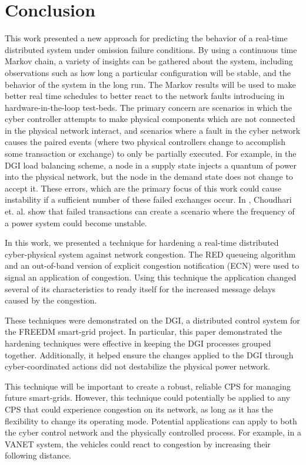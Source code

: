 
\chapter{Conclusion}

This work presented a new approach for predicting the behavior of a real-time distributed system under omission failure conditions.
By using a continuous time Markov chain, a variety of insights can be gathered about the system, including observations such as how long a particular configuration will be stable, and the behavior of the system in the long run. 
The Markov results will be used  to make better real time schedules to better react to the network faults introducing in hardware-in-the-loop test-beds.
The primary concern are scenarios in which the cyber controller attempts to make physical components which are not connected in the physical network interact, and scenarios where a fault in the cyber network causes the paired events (where two physical controllers change to accomplish some transaction or exchange) to only be partially executed.
For example, in the DGI load balancing scheme, a node in a supply state injects a quantum of power into the physical network, but the node in the demand state does not change to accept it.
These errors, which are the primary focus of this work could cause instability if a sufficient number of these failed exchanges occur. In \cite{HARINI}, Choudhari et. al. show that failed transactions can create a scenario where the frequency of a power system could become unstable. 

In this work, we presented a technique for hardening a real-time distributed cyber-physical system against network congestion.
The \ac{RED} queueing algorithm and an out-of-band version of explicit congestion notification (ECN) were used to signal an application of congestion.
Using this technique the application changed several of its characteristics to ready itself for the increased message delays caused by the congestion.

These techniques were demonstrated on the \ac{DGI}, a distributed control system for the \ac{FREEDM} smart-grid project.
In particular, this paper demonstrated the hardening techniques were effective in keeping the \ac{DGI} processes grouped together.
Additionally, it helped ensure the changes applied to the \ac{DGI} through cyber-coordinated actions did not destabilize the physical power network.

This technique will be important to create a robust, reliable \ac{CPS} for managing future smart-grids.
However, this technique could potentially be applied to any \ac{CPS} that could experience congestion on its network, as long as it has the flexibility to change its operating mode.
Potential applications can apply to both the cyber control network and the physically controlled process.
For example, in a \ac{VANET} system, the vehicles could react to congestion by increasing their following distance.
